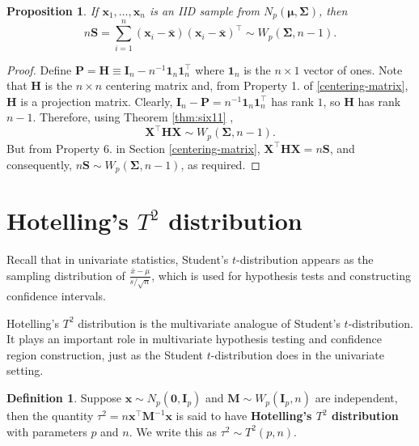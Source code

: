 \documentclass[]{book}
\newtheorem{proposition}{Proposition}[chapter]
\theoremstyle{definition}
\newtheorem{definition}{Definition}[chapter]
\theoremstyle{definition}
\theoremstyle{definition}
\theoremstyle{remark}
\begin{document}
\begin{proposition}
\protect\hypertarget{prp:six12}{}{\label{prp:six12} }If \(\boldsymbol x_1,\ldots,\boldsymbol x_n\) is an IID sample from \(N_p(\boldsymbol \mu,\boldsymbol \Sigma)\), then
\[ n \boldsymbol S= \sum_{i=1}^n (\boldsymbol x_i - \bar{\boldsymbol x})(\boldsymbol x_i - \bar{\boldsymbol x})^\top \sim W_p(\boldsymbol \Sigma,n-1).\]
\end{proposition}

\begin{proof}
{} Define \(\boldsymbol P= {\mathbf H}\equiv \mathbf I_n - n^{-1}{\mathbf 1}_n {\mathbf 1}_n^\top\) where \({\mathbf 1}_n\) is the \(n \times 1\) vector of ones. Note that \(\boldsymbol H\) is the \(n \times n\) centering matrix and, from Property 1. of \ref{centering-matrix}, \(\boldsymbol H\) is a projection matrix. Clearly, \(\mathbf I_n - \boldsymbol P=n^{-1} {\mathbf 1}_n {\mathbf 1}_n^\top\) has rank \(1\), so \(\boldsymbol H\) has rank \(n-1\). Therefore, using Theorem \ref{thm:six11} ,
\[
\boldsymbol X^\top \boldsymbol H\boldsymbol X\sim W_p(\boldsymbol \Sigma, n-1).
\]
But from Property 6. in Section \ref{centering-matrix}, \(\boldsymbol X^\top \boldsymbol H\boldsymbol X=n\boldsymbol S\),
and consequently, \(n\boldsymbol S\sim W_p(\boldsymbol \Sigma, n-1)\), as required.
\end{proof}

\hypertarget{hotellings-t2-distribution}{%
\section{\texorpdfstring{Hotelling's \(T^2\) distribution}{Hotelling's T\^{}2 distribution}}\label{hotellings-t2-distribution}}

Recall that in univariate statistics, Student's \(t\)-distribution appears as the sampling distribution of \(\frac{\bar{x}-\mu}{s/\sqrt{n}}\), which is used for hypothesis tests and constructing confidence intervals.

Hotelling's \(T^2\) distribution is the multivariate analogue of Student's \(t\)-distribution. It plays an important role in multivariate hypothesis testing and confidence region construction, just as the Student \(t\)-distribution does in the univariate setting.

\begin{definition}
\protect\hypertarget{def:Hotelling}{}{\label{def:Hotelling} }Suppose \(\boldsymbol x\sim N_p(\boldsymbol 0,\mathbf I_p)\) and \(\boldsymbol M\sim W_p(\mathbf I_p,n)\) are independent, then the quantity \(\tau ^2 = n \boldsymbol x^\top \boldsymbol M^{-1} \boldsymbol x\) is said to have \textbf{Hotelling's \(T^2\) distribution} with parameters \(p\) and \(n\). We write this as \(\tau^2 \sim T^2(p,n)\).
\end{definition}
\end{document}
